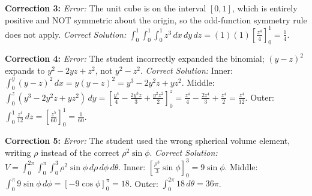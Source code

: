 \documentclass[12pt]{article}
\begin{document}
\textbf{Correction 3:} 
\textit{Error:} The unit cube is on the interval $[0,1]$, which is entirely positive and NOT symmetric about the origin, so the odd-function symmetry rule does not apply.
\textit{Correct Solution:} $\int_{0}^{1} \int_{0}^{1} \int_{0}^{1} z^3 \, dx \, dy \, dz = (1)(1)\left[ \frac{z^4}{4} \right]_{0}^{1} = \frac{1}{4}$.

\textbf{Correction 4:} 
\textit{Error:} The student incorrectly expanded the binomial; $(y-z)^2$ expands to $y^2 - 2yz + z^2$, not $y^2 - z^2$.
\textit{Correct Solution:} Inner: $\int_{0}^{y} (y-z)^2 \, dx = y(y-z)^2 = y^3 - 2y^2z + yz^2$. 
Middle: $\int_{0}^{z} (y^3 - 2y^2z + yz^2) \, dy = \left[ \frac{y^4}{4} - \frac{2y^3z}{3} + \frac{y^2z^2}{2} \right]_{0}^{z} = \frac{z^4}{4} - \frac{2z^4}{3} + \frac{z^4}{2} = \frac{z^4}{12}$.
Outer: $\int_{0}^{1} \frac{z^4}{12} \, dz = \left[ \frac{z^5}{60} \right]_{0}^{1} = \frac{1}{60}$.

\textbf{Correction 5:} 
\textit{Error:} The student used the wrong spherical volume element, writing $\rho$ instead of the correct $\rho^2 \sin\phi$.
\textit{Correct Solution:} $V = \int_{0}^{2\pi} \int_{0}^{\pi} \int_{0}^{3} \rho^2 \sin\phi \, d\rho \, d\phi \, d\theta$. 
Inner: $\left[ \frac{\rho^3}{3} \sin\phi \right]_{0}^{3} = 9\sin\phi$. 
Middle: $\int_{0}^{\pi} 9\sin\phi \, d\phi = \left[ -9\cos\phi \right]_{0}^{\pi} = 18$. 
Outer: $\int_{0}^{2\pi} 18 \, d\theta = 36\pi$.
\end{document}
